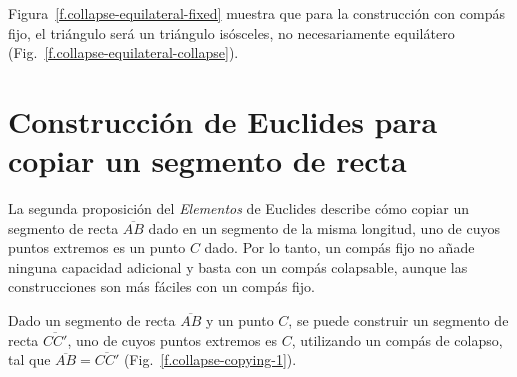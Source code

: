 Figura~\ref{f.collapse-equilateral-fixed} muestra que para la construcción con compás fijo, el triángulo será un triángulo isósceles, no necesariamente equilátero (Fig.~\ref{f.collapse-equilateral-collapse}).

\section{Construcción de Euclides para copiar un segmento de recta}\label{s.collapse-copy}

La segunda proposición del \textit{Elementos} de Euclides describe cómo copiar un segmento de recta $\overline{AB}$ dado en un segmento de la misma longitud, uno de cuyos puntos extremos es un punto $C$ dado. Por lo tanto, un compás fijo no añade ninguna capacidad adicional y basta con un compás colapsable, aunque las construcciones son más fáciles con un compás fijo.

\begin{theorem}
Dado un segmento de recta $\overline{AB}$ y un punto $C$, se puede construir un segmento de recta $\overline{CC'}$, uno de cuyos puntos extremos es $C$, utilizando un compás de colapso, tal que $\overline{AB}=\overline{CC'}$ (Fig.~\ref{f.collapse-copying-1}).
\end{theorem}


